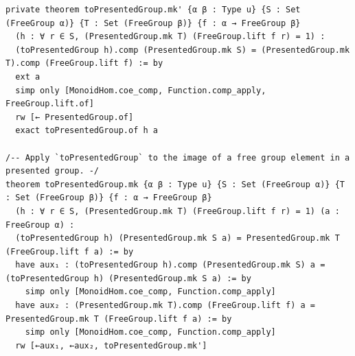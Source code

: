 \begin{Verbatim}
private theorem toPresentedGroup.mk' {α β : Type u} {S : Set (FreeGroup α)} {T : Set (FreeGroup β)} {f : α → FreeGroup β}
  (h : ∀ r ∈ S, (PresentedGroup.mk T) (FreeGroup.lift f r) = 1) :
  (toPresentedGroup h).comp (PresentedGroup.mk S) = (PresentedGroup.mk T).comp (FreeGroup.lift f) := by
  ext a
  simp only [MonoidHom.coe_comp, Function.comp_apply, FreeGroup.lift.of]
  rw [← PresentedGroup.of]
  exact toPresentedGroup.of h a

/-- Apply `toPresentedGroup` to the image of a free group element in a presented group. -/
theorem toPresentedGroup.mk {α β : Type u} {S : Set (FreeGroup α)} {T : Set (FreeGroup β)} {f : α → FreeGroup β}
  (h : ∀ r ∈ S, (PresentedGroup.mk T) (FreeGroup.lift f r) = 1) (a : FreeGroup α) :
  (toPresentedGroup h) (PresentedGroup.mk S a) = PresentedGroup.mk T (FreeGroup.lift f a) := by
  have aux₁ : (toPresentedGroup h).comp (PresentedGroup.mk S) a = (toPresentedGroup h) (PresentedGroup.mk S a) := by
    simp only [MonoidHom.coe_comp, Function.comp_apply]
  have aux₂ : (PresentedGroup.mk T).comp (FreeGroup.lift f) a = PresentedGroup.mk T (FreeGroup.lift f a) := by
    simp only [MonoidHom.coe_comp, Function.comp_apply]
  rw [←aux₁, ←aux₂, toPresentedGroup.mk']
\end{Verbatim}
